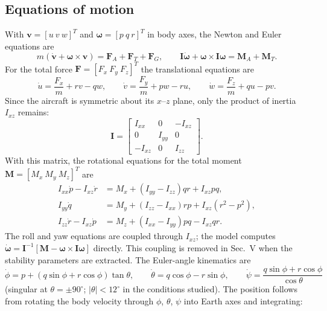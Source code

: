 \documentclass[conf]{new-aiaa}
\begin{document}
\subsection{Equations of motion}
With $\mathbf v=[u\ v\ w]^T$ and $\boldsymbol\omega=[p\ q\ r]^T$ in body axes, the Newton and Euler equations are~\cite{slj}
\begin{equation}
m(\dot{\mathbf v}+\boldsymbol\omega\times\mathbf v)=\mathbf F_A+\mathbf F_T+\mathbf F_G, \qquad
\mathbf I\dot{\boldsymbol\omega}+\boldsymbol\omega\times\mathbf I\boldsymbol\omega=\mathbf M_A+\mathbf M_T.
\label{eq:eom}
\end{equation}
For the total force $\mathbf F=[F_x\ F_y\ F_z]^T$ the translational equations are
\begin{equation}
\dot u=\frac{F_x}{m}+rv-qw,\qquad
\dot v=\frac{F_y}{m}+pw-ru,\qquad
\dot w=\frac{F_z}{m}+qu-pv.
\end{equation}
Since the aircraft is symmetric about its $x$--$z$ plane, only the product of inertia $I_{xz}$ remains:
\begin{equation}
\mathbf I=\begin{bmatrix} I_{xx} & 0 & -I_{xz}\\ 0 & I_{yy} & 0\\ -I_{xz} & 0 & I_{zz}\end{bmatrix}.
\end{equation}
With this matrix, the rotational equations for the total moment $\mathbf M=[M_x\ M_y\ M_z]^T$ are
\begin{equation}
\begin{aligned}
I_{xx}\dot p-I_{xz}\dot r&=M_x+(I_{yy}-I_{zz})qr+I_{xz}pq,\\
I_{yy}\dot q&=M_y+(I_{zz}-I_{xx})rp+I_{xz}(r^2-p^2),\\
I_{zz}\dot r-I_{xz}\dot p&=M_z+(I_{xx}-I_{yy})pq-I_{xz}qr.
\end{aligned}
\label{eq:rot}
\end{equation}
The roll and yaw equations are coupled through $I_{xz}$; the model computes $\dot{\boldsymbol\omega}=\mathbf I^{-1}[\mathbf M-\boldsymbol\omega\times\mathbf I\boldsymbol\omega]$ directly. This coupling is removed in Sec.~V when the stability parameters are extracted. The Euler-angle kinematics are
\begin{equation}
\dot\phi=p+(q\sin\phi+r\cos\phi)\tan\theta,\qquad
\dot\theta=q\cos\phi-r\sin\phi,\qquad
\dot\psi=\frac{q\sin\phi+r\cos\phi}{\cos\theta}
\label{eq:kin}
\end{equation}
(singular at $\theta=\pm90^\circ$; $|\theta|<12^\circ$ in the conditions studied). The position follows from rotating the body velocity through $\phi$, $\theta$, $\psi$ into Earth axes and integrating:
\end{document}
